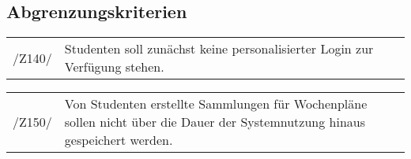 \subsection{Abgrenzungskriterien}

\begin{tabular}{p{1.5cm}p{14.5cm}}	
	 /Z140/& Studenten soll zunächst keine personalisierter Login zur Verfügung stehen.  \\[0.25cm]
\end{tabular}

\begin{tabular}{p{1.5cm}p{14.5cm}}	
	 /Z150/& Von Studenten erstellte Sammlungen für Wochenpläne sollen nicht über die Dauer der Systemnutzung hinaus gespeichert werden. \\[0.25cm]
\end{tabular}